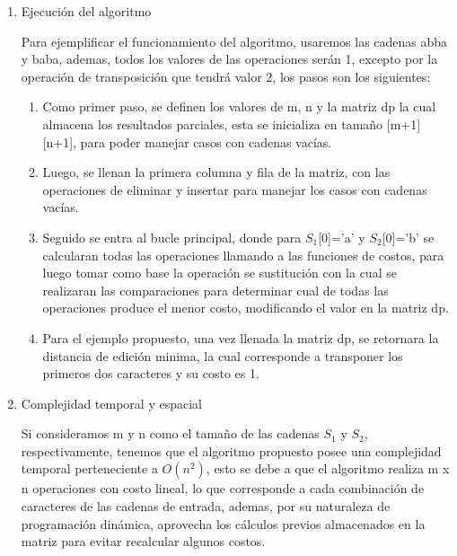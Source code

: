 \begin{enumerate}[1)]
\begin{algorithm}[H]
{{{                
            }
            }

            \;
    }

\end{algorithm}

\item Ejecución del algoritmo

Para ejemplificar el funcionamiento del algoritmo, usaremos las cadenas
abba y baba, ademas, todos los valores de las operaciones serán 1, excepto
por la operación de transposición que tendrá valor 2, los pasos son los siguientes:

\begin{enumerate}[1)]
    \item Como primer paso, se definen los valores de m, n y la matriz dp la cual almacena
    los resultados parciales, esta se inicializa en tamaño [m+1][n+1], para poder manejar
    casos con cadenas vacías.

\item Luego, se llenan la primera columna y fila de la matriz, con las operaciones
de eliminar y insertar para manejar los casos con cadenas vacías.

\item Seguido se entra al bucle principal, donde para $S_1$[0]='a' y $S_2$[0]='b' se calcularan
todas las operaciones llamando a las funciones de costos, para luego tomar como base la operación se sustitución con la cual
se realizaran las comparaciones para determinar cual de todas las operaciones produce el menor
costo, modificando el valor en la matriz dp.

\item Para el ejemplo propuesto, una vez llenada la matriz dp, se retornara la distancia
de edición minima, la cual corresponde a transponer los primeros dos caracteres y su costo es 1.

\end{enumerate}


    \item Complejidad temporal y espacial
    
    Si consideramos m y n como el tamaño de las cadenas $S_1$ y $S_2$, 
    respectivamente, tenemos que
    el algoritmo propuesto posee una complejidad temporal 
    perteneciente a $O\left(n^{2}\right)$, esto
    se debe a que el algoritmo realiza m x n operaciones con costo lineal, lo que corresponde
    a cada combinación de caracteres de las cadenas de entrada, ademas, por su naturaleza
    de programación dinámica, aprovecha los cálculos previos almacenados en la matriz para 
    evitar recalcular algunos costos.
    

\end{enumerate}
